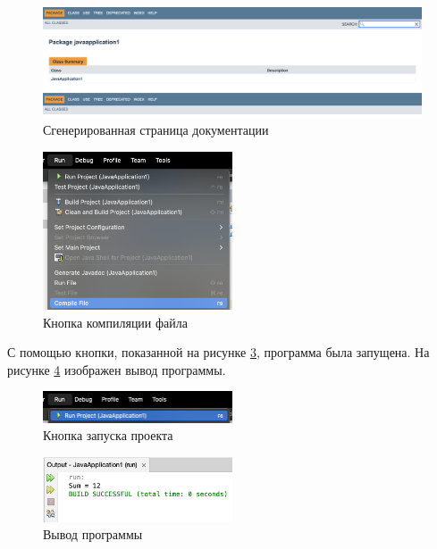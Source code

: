 \documentclass[a4paper, 14pt]{extarticle}
\begin{document}
\begin{figure}[H]
  \centering
  \includegraphics[width=\textwidth]{images/task-4/3.png}
  \caption{Сгенерированная страница документации}
  \label{fig:task-4-3}
\end{figure}

\begin{figure}[H]
  \centering
  \includegraphics[width=0.5\textwidth]{images/task-4/4.png}
  \caption{Кнопка компиляции файла}
  \label{fig:task-4-4}
\end{figure}

С помощью кнопки, показанной на рисунке \ref{fig:task-4-5}, программа была
запущена. На рисунке \ref{fig:task-4-6} изображен вывод программы.

\begin{figure}[H]
  \centering
  \includegraphics[width=0.5\textwidth]{images/task-4/5.png}
  \caption{Кнопка запуска проекта}
  \label{fig:task-4-5}
\end{figure}

\begin{figure}[H]
  \centering
  \includegraphics[width=0.5\textwidth]{images/task-4/6.png}
  \caption{Вывод программы}
  \label{fig:task-4-6}
\end{figure}
\end{document}

